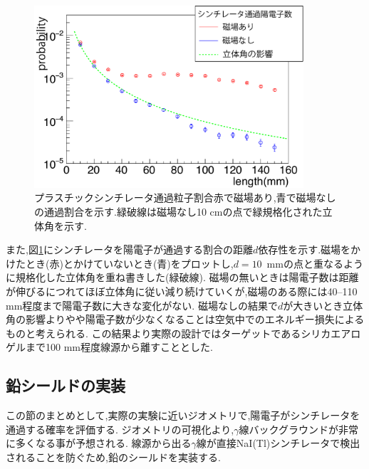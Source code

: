 \begin{figure}[!tbp]
	\centering
	\includegraphics[width=10cm]{fig/scinti_test.pdf}
	\caption[プラスチックシンチレータ通過粒子割合]{プラスチックシンチレータ通過粒子割合\newline 赤で磁場あり,青で磁場なしの通過割合を示す.緑破線は磁場なし10 cmの点で緑規格化された立体角を示す.}
	\label{scinti_test}
\end{figure}


また,図\ref{scinti_test}にシンチレータを陽電子が通過する割合の距離$d$依存性を示す.磁場をかけたとき(赤)とかけていないとき(青)をプロットし,$d=10$\, mmの点と重なるように規格化した立体角を重ね書きした(緑破線).
磁場の無いときは陽電子数は距離が伸びるにつれてほぼ立体角に従い減り続けていくが,磁場のある際には40--110 mm程度まで陽電子数に大きな変化がない.
磁場なしの結果で$d$が大きいとき立体角の影響よりやや陽電子数が少なくなることは空気中でのエネルギー損失によるものと考えられる.
この結果より実際の設計ではターゲットであるシリカエアロゲルまで100 mm程度線源から離すこととした.

\subsection{鉛シールドの実装}
この節のまとめとして,実際の実験に近いジオメトリで,陽電子がシンチレータを通過する確率を評価する.
ジオメトリの可視化より,$\gamma$線バックグラウンドが非常に多くなる事が予想される.
線源から出る$\gamma$線が直接NaI(Tl)シンチレータで検出されることを防ぐため,鉛のシールドを実装する.

